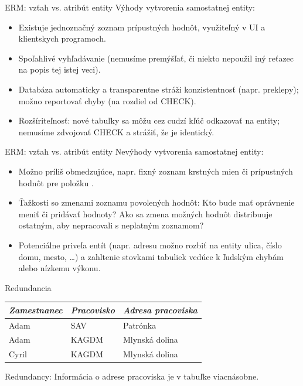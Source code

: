 \documentclass[12pt]{beamer}
\begin{document}
\begin{frame}[fragile]{ERM: vzťah vs. atribút entity}
Výhody vytvorenia samostatnej entity:
\begin{itemize}
\item Existuje jednoznačný zoznam prípustných hodnôt, využiteľný v UI a klientskych programoch.
\item Spoľahlivé vyhľadávanie (nemusíme premýšľať, či niekto nepoužil iný reťazec na popis tej istej veci).
\item Databáza automaticky a transparentne stráži konzistentnosť (napr. preklepy); možno  reportovať chyby (na rozdiel od CHECK).
\item Rozšíriteľnosť: nové tabuľky sa môžu cez cudzí kľúč odkazovať na entity; nemusíme zdvojovať CHECK a strážiť, že je identický.
\end{itemize}
\end{frame}

\begin{frame}[fragile]{ERM: vzťah vs. atribút entity}
Nevýhody vytvorenia samostatnej entity:
\begin{itemize}
\item Možno príliš obmedzujúce, napr. fixný zoznam krstných mien či prípustných hodnôt pre položku .
\item Ťažkosti so zmenami zoznamu povolených hodnôt:
    Kto bude mať oprávnenie meniť či pridávať hodnoty?
    Ako sa zmena možných hodnôt distribuuje ostatným, aby nepracovali s neplatným zoznamom?
\item Potenciálne priveľa entít (napr. adresu možno rozbiť na entity ulica, číslo domu, mesto, \dots)
    a zahltenie stovkami tabuliek vedúce k ľudským chybám alebo nízkemu výkonu.
\end{itemize}
\end{frame}

\begin{frame}[fragile]{Redundancia}
\begin{tabular}{|l|l|l|}
\hline
\emph{Zamestnanec} & \emph{Pracovisko} & \emph{Adresa pracoviska} \\\hline
Adam & SAV & Patrónka \\\hline
Adam & KAGDM & Mlynská dolina \\\hline
Cyril & KAGDM & Mlynská dolina \\\hline
\end{tabular}
\bigskip

\alert{Redundancy}: Informácia o adrese pracoviska je v tabuľke viacnásobne.
\end{frame}
\end{document}
